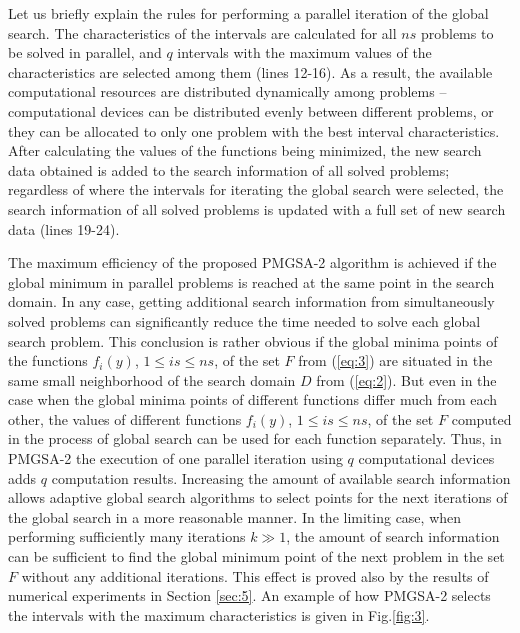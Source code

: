\documentclass[review]{elsarticle}
\begin{document}
Let us briefly explain the rules for performing a parallel iteration of the global search. The characteristics of the intervals are calculated for all $ns$ problems to be solved in parallel, and $q$ intervals with the maximum values of the characteristics are selected among them (lines 12-16). As a result, the available computational resources are distributed dynamically among problems -- computational devices can be distributed evenly between different problems, or they can be allocated to only one problem with the best interval characteristics. After calculating the values of the functions being minimized, the new search data obtained is added to the search information of all solved problems; regardless of where the intervals for iterating the global search were selected, the search information of all solved problems is updated with a full set of new search data (lines 19-24).

The maximum efficiency of the proposed PMGSA-2 algorithm is achieved if the global minimum in parallel problems is reached at the same point in the search domain. In any case, getting additional search information from simultaneously solved problems can significantly reduce the time needed to solve each global search problem. This conclusion is rather obvious if the global minima points of the functions $f_i (y)$, $1 \leq is \leq ns$, of the set $F$ from (\ref{eq:3}) are situated in the same small neighborhood of the search domain $D$ from (\ref{eq:2}). But even in the case when the global minima points of different functions differ much from each other, the values of different functions $f_i (y)$, $1 \leq is \leq ns$, of the set $F$ computed in the process of global search can be used for each function separately. Thus, in PMGSA-2 the execution of one parallel iteration using $q$ computational devices adds $q$ computation results. Increasing the amount of available search information allows adaptive global search algorithms to select points for the next iterations of the global search in a more reasonable manner. In the limiting case, when performing sufficiently many iterations $k \gg 1$, the amount of search information can be sufficient to find the global minimum point of the next problem in the set $F$ without any additional iterations. This effect is proved also by the results of numerical experiments in Section \ref{sec:5}. An example of how PMGSA-2 selects the intervals with the maximum characteristics is given in Fig.\ref{fig:3}.
\end{document}

